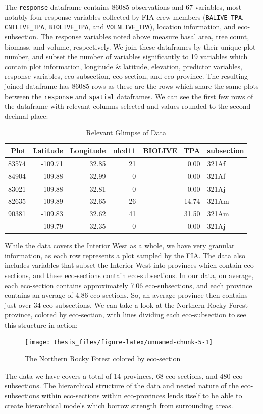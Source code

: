 \documentclass[12pt,twoside]{reedthesis}
\begin{document}
The \texttt{response} dataframe contains 86085 observations and 67 variables, most notably four response variables collected by FIA crew members (\texttt{BALIVE\_TPA}, \texttt{CNTLIVE\_TPA}, \texttt{BIOLIVE\_TPA}, and \texttt{VOLNLIVE\_TPA}), location information, and eco-subsection. The response variables noted above measure basal area, tree count, biomass, and volume, respectively. We join these dataframes by their unique plot number, and subset the number of variables significantly to 19 variables which contain plot information, longitude \& latitude, elevation, predictor variables, response variables, eco-subsection, eco-section, and eco-province. The resulting joined dataframe has 86085 rows as these are the rows which share the same plots between the \texttt{response} and \texttt{spatial} dataframes. We can see the first few rows of the dataframe with relevant columns selected and values rounded to the second decimal place:
\begin{longtable}[t]{rrrrrl}
\caption[Relevant Glimpse of Data]{\label{tab:unnamed-chunk-4}Relevant Glimpse of Data}\\
\toprule
Plot & Latitude & Longitude & nlcd11 & BIOLIVE\_TPA & subsection\\
\midrule
83574 & -109.71 & 32.85 & 21 & 0.00 & 321Af\\
84904 & -109.88 & 32.99 & 0 & 0.00 & 321Af\\
83021 & -109.88 & 32.81 & 0 & 0.00 & 321Aj\\
82635 & -109.89 & 32.65 & 26 & 14.74 & 321Am\\
90381 & -109.83 & 32.62 & 41 & 31.50 & 321Am\\
\addlinespace
81801 & -109.79 & 32.35 & 0 & 0.00 & 321Aj\\
\bottomrule
\end{longtable}
While the data covers the Interior West as a whole, we have very granular information, as each row represents a plot sampled by the FIA. The data also includes variables that subset the Interior West into provinces which contain eco-sections, and these eco-sections contain eco-subsections. In our data, on average, each eco-section contains approximately 7.06 eco-subsections, and each province contains an average of 4.86 eco-sections. So, an average province then contains just over 34 eco-subsections. We can take a look at the Northern Rocky Forest province, colored by eco-section, with lines dividing each eco-subsection to see this structure in action:
\begin{figure}

{\centering \texttt{[image: thesis\_files/figure-latex/unnamed-chunk-5-1]} 

}

\caption{The Northern Rocky Forest colored by eco-section}\label{fig:unnamed-chunk-5}
\end{figure}
The data we have covers a total of 14 provinces, 68 eco-sections, and 480 eco-subsections. The hierarchical structure of the data and nested nature of the eco-subsections within eco-sections within eco-provinces lends itself to be able to create hierarchical models which borrow strength from surrounding areas.
\end{document}
